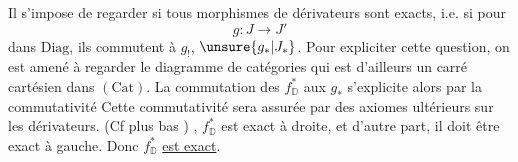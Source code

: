 Il s'impose de regarder si tous  morphismes de dérivateurs sont exacts, i.e. si pour
\[
g:J\longrightarrow J'
\]
dans $\mathrm{Diag}$, ils commutent à $g_!$, $\unsure{g_*|J_*}$.
Pour expliciter cette question, on est amené à regarder le diagramme de catégories
qui est d'ailleurs un carré cartésien dans $(\mathrm{Cat})$.
La commutation des $f^*_{\mathbb D}$ aux $g_*$ s'explicite alors par la commutativité 
Cette commutativité sera assurée par des axiomes ultérieurs sur les dérivateurs. (Cf plus bas ) , $f^*_{\mathbb D}$ est exact à droite, et d'autre part, il doit être  exact à gauche. Donc $f^*_{\mathbb D}$  \uline{est exact}.

